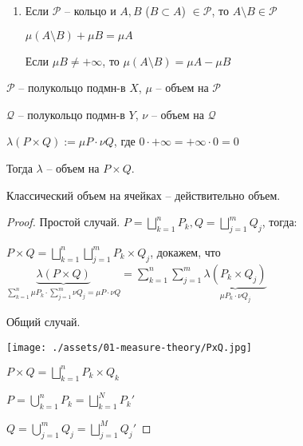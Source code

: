 \begin{remark}
    \begin{enumerate}
        \item {
            Если $\mathcal{P}$ -- кольцо и $A, B$ ($B \subset A$) $ \in \mathcal{P}$, то $A \setminus B \in \mathcal{P}$

            $\mu (A \setminus B) + \mu B = \mu A$

            Если $\mu B \neq +\infty$, то $\mu (A \setminus B) = \mu A - \mu B$
        }
    \end{enumerate}
\end{remark}

\begin{theorem}
    $\mathcal{P}$ -- полукольцо подмн-в $X$, $\mu$ -- объем на $\mathcal{P}$

    $\mathcal{Q}$ -- полукольцо подмн-в $Y$, $\nu$ -- объем на $\mathcal{Q}$

    $\lambda(P \times Q) := \mu P \cdot \nu Q$, где $0 \cdot +\infty = +\infty \cdot 0 = 0$

    Тогда $\lambda$ -- объем на $P \times Q$.
\end{theorem}
\begin{consequence}
    Классический объем на ячейках -- действительно объем.
\end{consequence}
\begin{proof}
    Простой случай. $P = \bigsqcup_{k=1}^{n}P_k, Q = \bigsqcup_{j=1}^m Q_j$, тогда:

    $P \times Q = \bigsqcup_{k=1}^{n} \bigsqcup_{j=1}^{m} P_k \times Q_j$, докажем, что $\underbrace{\lambda (P \times Q)}_{\sum_{k=1}^n \mu P_k \cdot \sum_{j=1}^m \nu Q_j = \mu P \cdot \nu Q} = \sum_{k=1}^n \sum_{j=1}^m \underbrace{\lambda (P_k \times Q_j)}_{\mu P_k \cdot \nu Q_j}$

    Общий случай.

    \begin{center}
        \texttt{[image: ./assets/01-measure-theory/PxQ.jpg]}
    \end{center}

    $P \times Q = \bigsqcup_{k=1}^{n} P_k \times Q_k$
    
    $P = \bigcup_{k=1}^{n} P_k = \bigsqcup_{k=1}^{N} P_k'$

    $Q = \bigcup_{j=1}^{m} Q_j = \bigsqcup_{j=1}^{M} Q_j'$
\end{proof}

